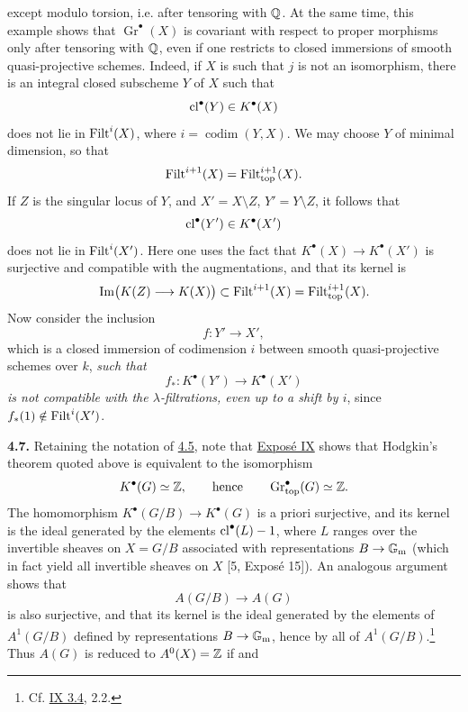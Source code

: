 except modulo torsion, i.e. after tensoring with $\mathbb Q$. At the same time,
this example shows that $\operatorname{Gr}^\bullet(X)$ is covariant with
respect to proper morphisms only after tensoring with $\mathbb Q$, even if one
restricts to closed immersions of smooth quasi-projective schemes. Indeed,
if $X$ is such that $j$ is not an isomorphism, there is an integral closed
subscheme $Y$ of $X$ such that
\[
 \operatorname{cl}^\bullet(Y)\in K^\bullet(X)
\]
does not lie in $\operatorname{Filt}^i(X)$, where $i=\operatorname{codim}(Y,X)$. We may
choose $Y$ of minimal dimension, so that
\[
 \operatorname{Filt}^{i+1}(X)=\operatorname{Filt}_{\mathrm{top}}^{i+1}(X).
\]
If $Z$ is the singular locus of $Y$, and $X'=X\setminus Z$,
$Y'=Y\setminus Z$, it follows that
\[
 \operatorname{cl}^\bullet(Y')\in K^\bullet(X')
\]
does not lie in $\operatorname{Filt}^i(X')$. Here one uses the fact that
$K^\bullet(X)\to K^\bullet(X')$ is surjective and compatible with the
augmentations, and that its kernel is
\[
 \operatorname{Im}\bigl(K(Z)\longrightarrow K(X)\bigr)
 \subset
 \operatorname{Filt}^{i+1}(X)=\operatorname{Filt}_{\mathrm{top}}^{i+1}(X).
\]
Now consider the inclusion
\[
 f:Y'\longrightarrow X',
\]
which is a closed immersion of codimension $i$ between smooth
quasi-projective schemes over $k$, \emph{such that}
\[
 f_*:K^\bullet(Y')\longrightarrow K^\bullet(X')
\]
\emph{is not compatible with the $\lambda$-filtrations, even up to a shift
by $i$}, since $f_*(1)\notin\operatorname{Filt}^i(X')$.

\noindent{}\textbf{4.7.}
Retaining the notation of \hyperlink{sga6.e14.para.4-5}{4.5}, note that \hyperlink{sga6.e09.expose}{Exposé IX} shows that Hodgkin's
theorem quoted above is equivalent to the isomorphism
\[
 K^\bullet(G)\simeq\mathbb Z,
 \qquad\text{hence}\qquad
 \operatorname{Gr}_{\mathrm{top}}^\bullet(G)\simeq\mathbb Z.
\]
The homomorphism $K^\bullet(G/B)\to K^\bullet(G)$ is a priori surjective,
and its kernel is the ideal generated by the elements
$\operatorname{cl}^\bullet(L)-1$, where $L$ ranges over the invertible sheaves on $X=G/B$
associated with representations $B\to\mathbb G_{\mathrm m}$ (which in fact yield all
invertible sheaves on $X$ [5, Exposé 15]). An analogous argument shows that
\[
 A(G/B)\longrightarrow A(G)
\]
is also surjective, and that its kernel is the ideal generated by the
elements of $A^1(G/B)$ defined by representations $B\to\mathbb G_{\mathrm m}$, hence by all
of $A^1(G/B)$.\footnote{Cf. \hyperlink{sga6.e09.prop.3-4}{IX 3.4}, 2.2.} Thus $A(G)$ is reduced to
$A^0(X)=\mathbb Z$ if and

